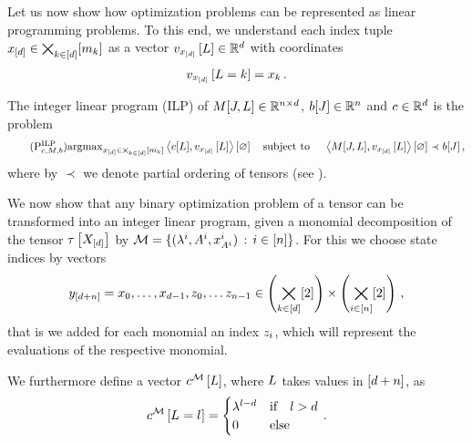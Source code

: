 
Let us now show how optimization problems can be represented as linear programming problems.
To this end, we understand each index tuple $x_{[d]}\in\bigtimes_{k\in[d]}[m_{k}]$ as a vector $v_{x_{[d]}}\left[L\right]\in\mathbb{R}^{d}$ with coordinates
\begin{align*}
    v_{x_{[d]}}\left[L=k\right] = x_{k} \, .
\end{align*}

\begin{definition}
    The integer linear program (ILP) of $M[J,L]\in\mathbb{R}^{n \times d}$, $b[J]\in\mathbb{R}^{n}$ and $c\in\mathbb{R}^{d}$ is the problem
    \begin{align}
        \tag{$\probtagtypeinst{\mathrm{ILP}}{\objectivesymbol,\exmatrix,\rhssymbol}$}
        \argmax_{\shortcatindices\in\facstates} \contraction{\objectivesymbol[\selvariable], \statevectorofat{\shortcatindices}{\selvariable}}
        \quad \text{subject to } \quad \contraction{\matrixat{\datvariable,\selvariable},\statevectorofat{\shortcatindices}{\selvariable}} \prec \rhssymbol[\datvariable] \, ,
    \end{align}
    where by $\prec$ we denote partial ordering of tensors (see ).
\end{definition}


We now show that any binary optimization problem of a tensor can be transformed into an integer linear program, given a monomial decomposition of the tensor $\tau\left[X_{[d]}\right]$ by $\mathcal{M}=\{(\lambda^{i}, A^{i}, x_{A^{i}}^{i}) \,:\, i\in[n]\}$.
For this we choose state indices by vectors
\begin{align*}
    y_{[d+n]} = x_{0},\ldots,x_{d-1},z_{0},\ldots z_{n-1} \in \left(\bigtimes_{k\in[d]}[2]\right) \times  \left(\bigtimes_{i\in[n]}[2]\right) \, ,
\end{align*}
that is we added for each monomial an index $z_{i}$, which will represent the evaluations of the respective monomial.


We furthermore define a vector $c^{\mathcal{M}}\left[L\right]$, where $L$ takes values in $[d+n]$, as
\begin{align}
    \label{eq:ilpPotential}
    \objofat{\sliceset}{\indexedselvariable} =
    \begin{cases}
        \slicescalarof{\selindex-\catorder} & \ifspace \selindex>\catorder \\%
        0 & \text{else}
    \end{cases} \, .
\end{align}

